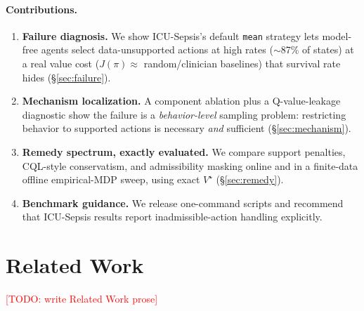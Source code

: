 \documentclass{article}
\newcommand{\todo}[1]{\textcolor{red}{[TODO: #1]}}
\begin{document}
\paragraph{Contributions.}
\begin{enumerate}[leftmargin=2em,itemsep=2pt,topsep=2pt]
  \item \textbf{Failure diagnosis.} We show ICU-Sepsis's default \texttt{mean}
  strategy lets model-free agents select data-unsupported actions at high rates
  ($\sim$87\% of states) at a real value cost ($J(\pi)\approx$ random/clinician
  baselines) that survival rate hides (\S\ref{sec:failure}).
  \item \textbf{Mechanism localization.} A component ablation plus a Q-value-leakage
  diagnostic show the failure is a \emph{behavior-level} sampling problem:
  restricting behavior to supported actions is necessary \emph{and} sufficient
  (\S\ref{sec:mechanism}).
  \item \textbf{Remedy spectrum, exactly evaluated.} We compare support penalties,
  CQL-style conservatism, and admissibility masking online and in a finite-data
  offline empirical-MDP sweep, using exact $V^\star$ (\S\ref{sec:remedy}).
  \item \textbf{Benchmark guidance.} We release one-command scripts and recommend
  that ICU-Sepsis results report inadmissible-action handling explicitly.
\end{enumerate}

\section{Related Work}
\todo{write Related Work prose}

\end{document}
